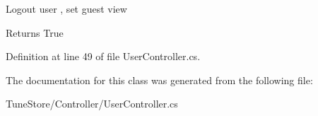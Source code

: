 Logout user , set guest view 

\begin{DoxyReturn}{Returns}
True
\end{DoxyReturn}


Definition at line 49 of file User\+Controller.\+cs.



The documentation for this class was generated from the following file\+:\begin{DoxyCompactItemize}
\item 
Tune\+Store/\+Controller/User\+Controller.\+cs\end{DoxyCompactItemize}
